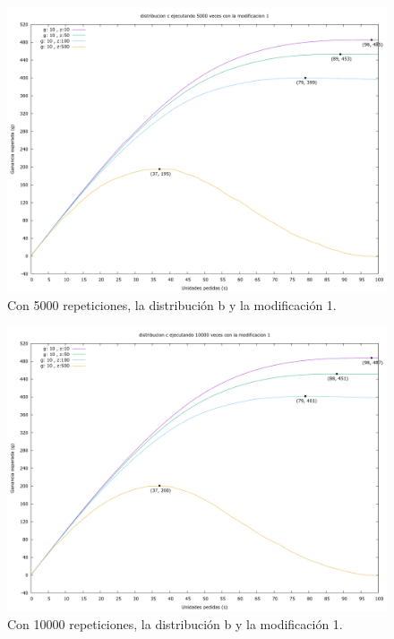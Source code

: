 \documentclass[12pt, spanish]{article}
\begin{document}
\begin{figure}[H]
	\centering
	\includegraphics[scale = 0.2]{prob_c/datos_c_5000_1.png}
	\caption{Con 5000 repeticiones, la distribución b y la modificación 1.}
	\label{fig:ej1_a_5000}

\end{figure}


\begin{figure}[H]
	\centering
	\includegraphics[scale = 0.2]{prob_c/datos_c_10000_1.png}
	\caption{Con 10000 repeticiones, la distribución b y la modificación 1.}
	\label{fig:ej1_a_10000}

\end{figure}
\end{document}
